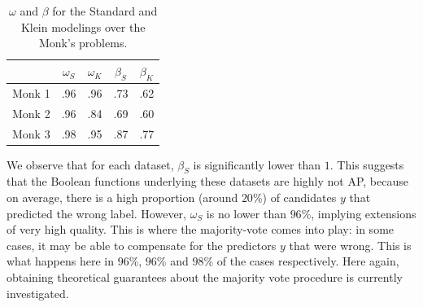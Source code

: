 \begin{table}
\centering
\begin{tabular}{| c | c | c | c | c |}
\toprule
  & $\omega_S$  & $\omega_K$ & $\beta_S$  &  $\beta_K$ \\
\midrule
Monk 1 & .96 & .96 & .73 & .62 \\
Monk 2 & .96 & .84 & .69 & .60 \\
Monk 3 & .98 & .95 & .87 & .77 \\
\bottomrule
\end{tabular}
\caption{$\omega$ and $\beta$ for the Standard and Klein modelings over the
  Monk's problems.}
\label{table_monks}
\end{table}

We observe that for each dataset, $\beta_S$ is significantly lower than $1$.
This suggests that the Boolean functions underlying these datasets are highly
not AP, because on average, there is a high proportion (around $20$\%) of
candidates $y$ that predicted the wrong label. However, $\omega_S$ is no lower
than $96$\%, implying extensions of very high quality.  This is where the
majority-vote comes into play: in some cases, it may be able to compensate for
the predictors $y$ that were wrong.  This is what happens here in $96$\%,
$96$\% and $98$\% of the cases respectively. Here again, obtaining theoretical
guarantees about the majority vote procedure is currently investigated.
